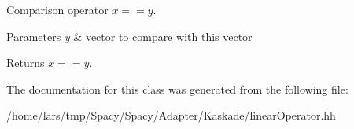 Comparison operator $ x==y$. 


\begin{DoxyParams}{Parameters}
{\em y} & vector to compare with this vector \\
\hline
\end{DoxyParams}
\begin{DoxyReturn}{Returns}
$ x==y$. 
\end{DoxyReturn}


The documentation for this class was generated from the following file\+:\begin{DoxyCompactItemize}
\item 
/home/lars/tmp/\+Spacy/\+Spacy/\+Adapter/\+Kaskade/linear\+Operator.\+hh\end{DoxyCompactItemize}
